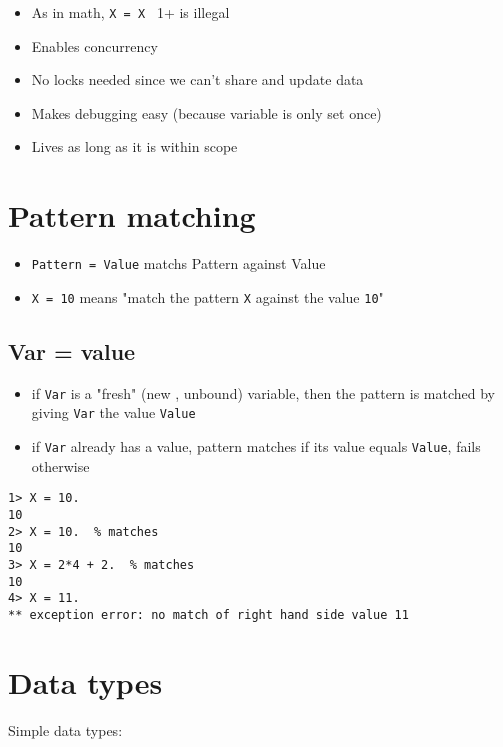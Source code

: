 \documentclass[12pt]{article}
\begin{document}
\begin{itemize}
\item As in math, \verb+X = X + 1+ is illegal
\item Enables concurrency
\item No locks needed since we can't share and update data
\item Makes debugging easy (because variable is only set once)
\item Lives as long as it is within scope
\end{itemize}

\section{Pattern matching}

\begin{itemize}
\item \verb+Pattern = Value+ matchs Pattern against Value
\item \verb+X = 10+
means "match the pattern \verb+X+ against the value \verb+10+"
\end{itemize}

\subsection{Var = value}

\begin{itemize}
\item if \verb+Var+ is a "fresh" (new , unbound) variable, then the pattern is matched by giving \verb+Var+ the value \verb+Value+
\item if \verb+Var+ already has a value, pattern matches if its value equals \verb+Value+, fails otherwise
\end{itemize}

\begin{verbatim}
1> X = 10.
10
2> X = 10.  % matches
10
3> X = 2*4 + 2.  % matches
10
4> X = 11.
** exception error: no match of right hand side value 11
\end{verbatim}


\section{Data types}

Simple data types:
\end{document}
